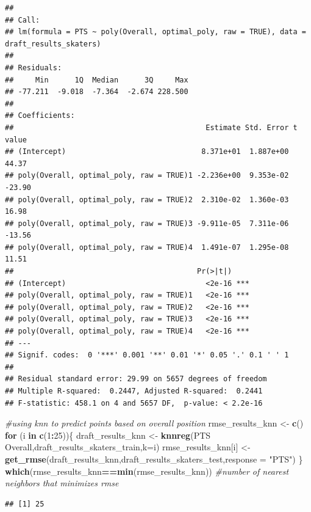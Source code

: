 \documentclass[]{article}
\newenvironment{Shaded}{\begin{snugshade}}{\end{snugshade}}
\newcommand{\CommentTok}[1]{\textcolor[rgb]{0.56,0.35,0.01}{\textit{#1}}}
\newcommand{\ControlFlowTok}[1]{\textcolor[rgb]{0.13,0.29,0.53}{\textbf{#1}}}
\newcommand{\DataTypeTok}[1]{\textcolor[rgb]{0.13,0.29,0.53}{#1}}
\newcommand{\DecValTok}[1]{\textcolor[rgb]{0.00,0.00,0.81}{#1}}
\newcommand{\KeywordTok}[1]{\textcolor[rgb]{0.13,0.29,0.53}{\textbf{#1}}}
\newcommand{\NormalTok}[1]{#1}
\newcommand{\OperatorTok}[1]{\textcolor[rgb]{0.81,0.36,0.00}{\textbf{#1}}}
\newcommand{\StringTok}[1]{\textcolor[rgb]{0.31,0.60,0.02}{#1}}
\begin{document}
\begin{verbatim}
## 
## Call:
## lm(formula = PTS ~ poly(Overall, optimal_poly, raw = TRUE), data = draft_results_skaters)
## 
## Residuals:
##     Min      1Q  Median      3Q     Max 
## -77.211  -9.018  -7.364  -2.674 228.500 
## 
## Coefficients:
##                                            Estimate Std. Error t value
## (Intercept)                               8.371e+01  1.887e+00   44.37
## poly(Overall, optimal_poly, raw = TRUE)1 -2.236e+00  9.353e-02  -23.90
## poly(Overall, optimal_poly, raw = TRUE)2  2.310e-02  1.360e-03   16.98
## poly(Overall, optimal_poly, raw = TRUE)3 -9.911e-05  7.311e-06  -13.56
## poly(Overall, optimal_poly, raw = TRUE)4  1.491e-07  1.295e-08   11.51
##                                          Pr(>|t|)    
## (Intercept)                                <2e-16 ***
## poly(Overall, optimal_poly, raw = TRUE)1   <2e-16 ***
## poly(Overall, optimal_poly, raw = TRUE)2   <2e-16 ***
## poly(Overall, optimal_poly, raw = TRUE)3   <2e-16 ***
## poly(Overall, optimal_poly, raw = TRUE)4   <2e-16 ***
## ---
## Signif. codes:  0 '***' 0.001 '**' 0.01 '*' 0.05 '.' 0.1 ' ' 1
## 
## Residual standard error: 29.99 on 5657 degrees of freedom
## Multiple R-squared:  0.2447, Adjusted R-squared:  0.2441 
## F-statistic: 458.1 on 4 and 5657 DF,  p-value: < 2.2e-16
\end{verbatim}

\begin{Shaded}
\begin{Highlighting}[]
\CommentTok{#using knn to predict points based on overall position}
\NormalTok{rmse_results_knn <-}\StringTok{ }\KeywordTok{c}\NormalTok{()}
\ControlFlowTok{for}\NormalTok{ (i }\ControlFlowTok{in} \KeywordTok{c}\NormalTok{(}\DecValTok{1}\OperatorTok{:}\DecValTok{25}\NormalTok{))\{}
\NormalTok{  draft_results_knn <-}\StringTok{ }\KeywordTok{knnreg}\NormalTok{(PTS }\OperatorTok{~}\StringTok{ }\NormalTok{Overall,draft_results_skaters_train,}\DataTypeTok{k=}\NormalTok{i)}
\NormalTok{  rmse_results_knn[i] <-}\StringTok{ }\KeywordTok{get_rmse}\NormalTok{(draft_results_knn,draft_results_skaters_test,}\DataTypeTok{response =} \StringTok{"PTS"}\NormalTok{)}
\NormalTok{\}}
\KeywordTok{which}\NormalTok{(rmse_results_knn}\OperatorTok{==}\KeywordTok{min}\NormalTok{(rmse_results_knn)) }\CommentTok{#number of nearest neighbors that minimizes rmse}
\end{Highlighting}
\end{Shaded}

\begin{verbatim}
## [1] 25
\end{verbatim}
\end{document}
